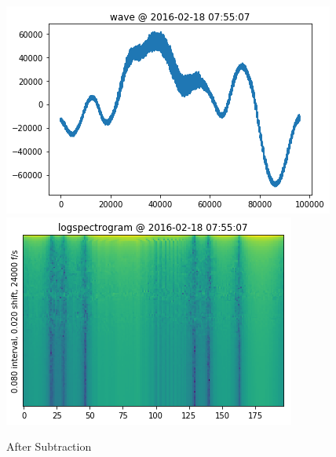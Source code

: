 \documentclass{article}
\begin{document}
\begin{multicols}{2}
\begin{figure}[H]
  \centering

  \includegraphics[width=\columnwidth]{./subwave.png}
  \includegraphics[width=\columnwidth]{./subspec.png}

  \caption{After Subtraction}
  \label{fig:subtract}

\end{figure}


\end{multicols}
\end{document}
